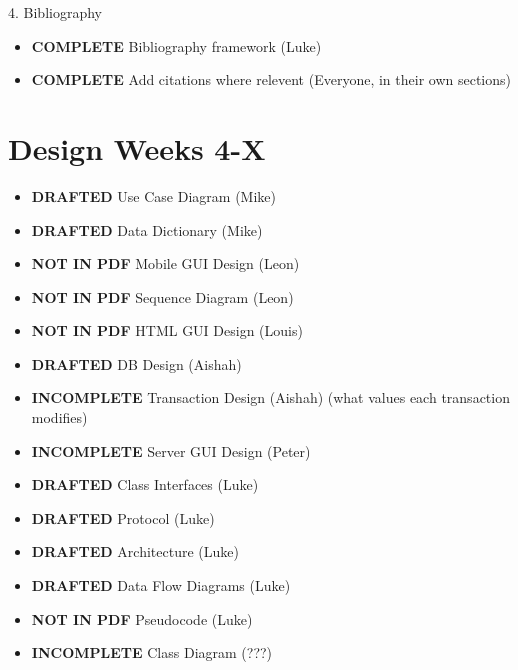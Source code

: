 4. Bibliography
\begin{itemize}
\item \textbf{COMPLETE} Bibliography framework (Luke)
\item \textbf{COMPLETE} Add citations where relevent (Everyone, in their own sections)
\end{itemize}

\section{Design \textbf{Weeks 4-X}}
\begin{itemize}
\item \textbf{DRAFTED}       Use Case Diagram (Mike)
\item \textbf{DRAFTED}       Data Dictionary (Mike)
\item \textbf{NOT IN PDF}    Mobile GUI Design (Leon)
\item \textbf{NOT IN PDF}    Sequence Diagram (Leon)
\item \textbf{NOT IN PDF}    HTML GUI Design (Louis)
\item \textbf{DRAFTED}       DB Design (Aishah)
\item \textbf{INCOMPLETE}    Transaction Design (Aishah) (what values each transaction modifies)
\item \textbf{INCOMPLETE}    Server GUI Design (Peter)
\item \textbf{DRAFTED}       Class Interfaces (Luke)
\item \textbf{DRAFTED}       Protocol (Luke)
\item \textbf{DRAFTED}       Architecture (Luke)
\item \textbf{DRAFTED}       Data Flow Diagrams (Luke)
\item \textbf{NOT IN PDF}    Pseudocode (Luke)
\item \textbf{INCOMPLETE}    Class Diagram (???)
\end{itemize}
